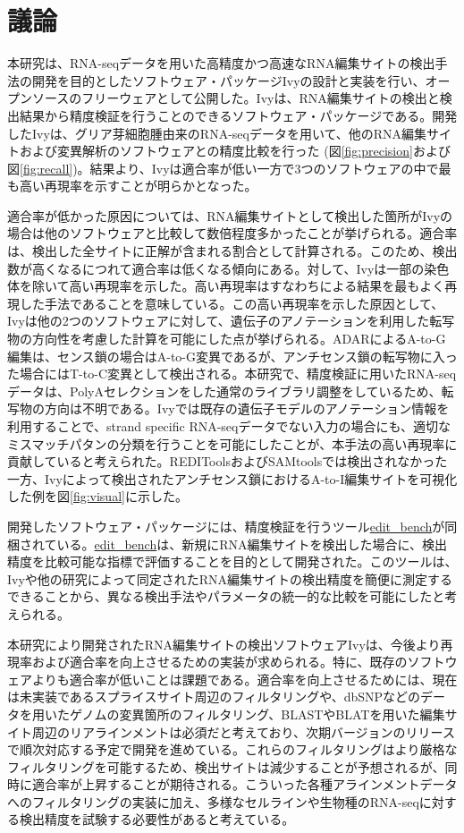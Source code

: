 \section{議論}
本研究は、RNA-seqデータを用いた高精度かつ高速なRNA編集サイトの検出手法の開発を目的としたソフトウェア・パッケージIvyの設計と実装を行い、オープンソースのフリーウェアとして公開した。Ivyは、RNA編集サイトの検出と検出結果から精度検証を行うことのできるソフトウェア・パッケージである。開発したIvyは、グリア芽細胞腫由来のRNA-seqデータを用いて、他のRNA編集サイトおよび変異解析のソフトウェアとの精度比較を行った (図\ref{fig:precision}および図\ref{fig:recall})。結果より、Ivyは適合率が低い一方で3つのソフトウェアの中で最も高い再現率を示すことが明らかとなった。
\par
適合率が低かった原因については、RNA編集サイトとして検出した箇所がIvyの場合は他のソフトウェアと比較して数倍程度多かったことが挙げられる。適合率は、検出した全サイトに正解が含まれる割合として計算される。このため、検出数が高くなるにつれて適合率は低くなる傾向にある。対して、Ivyは一部の染色体を除いて高い再現率を示した。高い再現率はすなわち\cite{BahLeeLi1201}による結果を最もよく再現した手法であることを意味している。この高い再現率を示した原因として、Ivyは他の2つのソフトウェアに対して、遺伝子のアノテーションを利用した転写物の方向性を考慮した計算を可能にした点が挙げられる。ADARによるA-to-G編集は、センス鎖の場合はA-to-G変異であるが、アンチセンス鎖の転写物に入った場合にはT-to-C変異として検出される。本研究で、精度検証に用いたRNA-seqデータは、PolyAセレクションをした通常のライブラリ調整をしているため、転写物の方向は不明である。Ivyでは既存の遺伝子モデルのアノテーション情報を利用することで、strand specific RNA-seqデータでない入力の場合にも、適切なミスマッチパタンの分類を行うことを可能にしたことが、本手法の高い再現率に貢献していると考えられた。REDIToolsおよびSAMtoolsでは検出されなかった一方、Ivyによって検出されたアンチセンス鎖におけるA-to-I編集サイトを可視化した例を図\ref{fig:visual}に示した。
\par
開発したソフトウェア・パッケージには、精度検証を行うツール\url{edit_bench}が同梱されている。\url{edit_bench}は、新規にRNA編集サイトを検出した場合に、検出精度を比較可能な指標で評価することを目的として開発された。このツールは、Ivyや他の研究によって同定されたRNA編集サイトの検出精度を簡便に測定するできることから、異なる検出手法やパラメータの統一的な比較を可能にしたと考えられる。
\par
本研究により開発されたRNA編集サイトの検出ソフトウェアIvyは、今後より再現率および適合率を向上させるための実装が求められる。特に、既存のソフトウェアよりも適合率が低いことは課題である。適合率を向上させるためには、現在は未実装であるスプライスサイト周辺のフィルタリングや、dbSNPなどのデータを用いたゲノムの変異箇所のフィルタリング、BLASTやBLATを用いた編集サイト周辺のリアラインメントは必須だと考えており、次期バージョンのリリースで順次対応する予定で開発を進めている。これらのフィルタリングはより厳格なフィルタリングを可能するため、検出サイトは減少することが予想されるが、同時に適合率が上昇することが期待される。こういった各種アラインメントデータへのフィルタリングの実装に加え、多様なセルラインや生物種のRNA-seqに対する検出精度を試験する必要性があると考えている。
